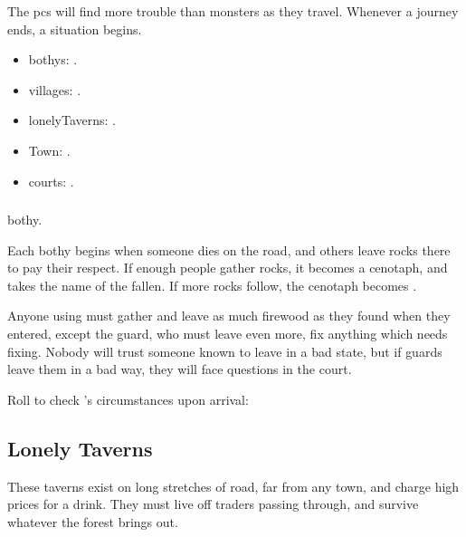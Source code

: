 \begin{multicols}{2}

\noindent
The \glspl{pc} will find more trouble than monsters as they travel.
Whenever a journey ends, a situation begins.

\begin{itemize}
  \item
  \Glspl{bothy}: .
  \item
  \Glspl{village}: .
  \item
  \Glspl{lonelyTavern}: .
  \item
  Town: .
  \item
  \Glspl{court}: .
\end{itemize}

\subsubsection{}
\label{bothyEvents}
\glsdesc{bothy}.

Each \gls{bothy} begins when someone dies on the road, and others leave rocks there to pay their respect.
If enough people gather rocks, it becomes a cenotaph, and takes the name of the fallen.
If more rocks follow, the cenotaph becomes .

Anyone using  must gather and leave as much firewood as they found when they entered, except the \gls{guard}, who must leave even more, fix anything which needs fixing.
Nobody will trust someone known to leave  in a bad state, but if \glspl{guard} leave them in a bad way, they will face questions in the \gls{court}.

Roll to check 's circumstances upon arrival:

\bothyEvents

\needspace{18em}
\subsubsection{}
\label{villageEvents}

\encVillageEvent

\subsection{Lonely Taverns}
\label{lonelyTaverns}

These taverns exist on long stretches of road, far from any town, and
charge high prices for a drink. They must live off traders passing
through, and survive whatever the forest brings out.


\end{multicols}
